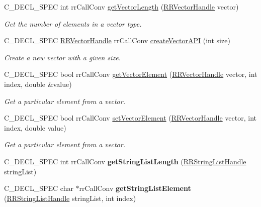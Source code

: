 \begin{DoxyCompactItemize}
\item 
\-C\-\_\-\-D\-E\-C\-L\-\_\-\-S\-P\-E\-C int rr\-Call\-Conv \hyperlink{group__loadsave_ga0c42e94111a64ea70824f92d8c1b564d}{get\-Vector\-Length} (\hyperlink{rr__c__types_8h_aea46a16752b0ae2cd95c009030ee630e}{\-R\-R\-Vector\-Handle} vector)
\begin{DoxyCompactList}\small\item\em \-Get the number of elements in a vector type. \end{DoxyCompactList}\item 
\-C\-\_\-\-D\-E\-C\-L\-\_\-\-S\-P\-E\-C \hyperlink{rr__c__types_8h_aea46a16752b0ae2cd95c009030ee630e}{\-R\-R\-Vector\-Handle} \*
rr\-Call\-Conv \hyperlink{group__loadsave_ga27e208d44bda0c744c9df5906b51cf09}{create\-Vector\-A\-P\-I} (int size)
\begin{DoxyCompactList}\small\item\em \-Create a new vector with a given size. \end{DoxyCompactList}\item 
\-C\-\_\-\-D\-E\-C\-L\-\_\-\-S\-P\-E\-C bool rr\-Call\-Conv \hyperlink{group__loadsave_gaf06c28a1e29d86f3fd3e6112eb7c85e8}{get\-Vector\-Element} (\hyperlink{rr__c__types_8h_aea46a16752b0ae2cd95c009030ee630e}{\-R\-R\-Vector\-Handle} vector, int index, double \&value)
\begin{DoxyCompactList}\small\item\em \-Get a particular element from a vector. \end{DoxyCompactList}\item 
\-C\-\_\-\-D\-E\-C\-L\-\_\-\-S\-P\-E\-C bool rr\-Call\-Conv \hyperlink{group__loadsave_ga77eaf0d0f88175ce4e2e8ca57ff9d859}{set\-Vector\-Element} (\hyperlink{rr__c__types_8h_aea46a16752b0ae2cd95c009030ee630e}{\-R\-R\-Vector\-Handle} vector, int index, double value)
\begin{DoxyCompactList}\small\item\em \-Get a particular element from a vector. \end{DoxyCompactList}\item 
\hypertarget{group__loadsave_ga451b4f6fe1d5aaabfdd11acb44f124bb}{
\-C\-\_\-\-D\-E\-C\-L\-\_\-\-S\-P\-E\-C int rr\-Call\-Conv {\bfseries get\-String\-List\-Length} (\hyperlink{rr__c__types_8h_abf561b014879247b7b92ee99c205de21}{\-R\-R\-String\-List\-Handle} string\-List)}
\label{group__loadsave_ga451b4f6fe1d5aaabfdd11acb44f124bb}

\item 
\hypertarget{group__loadsave_gac305395b75de8e66270d552492ff7df0}{
\-C\-\_\-\-D\-E\-C\-L\-\_\-\-S\-P\-E\-C char $\ast$rr\-Call\-Conv {\bfseries get\-String\-List\-Element} (\hyperlink{rr__c__types_8h_abf561b014879247b7b92ee99c205de21}{\-R\-R\-String\-List\-Handle} string\-List, int index)}
\label{group__loadsave_gac305395b75de8e66270d552492ff7df0}


\end{DoxyCompactItemize}
